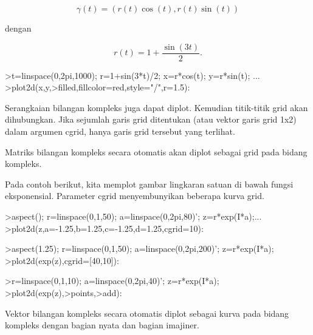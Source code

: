 \documentclass{article}
\begin{document}
\begin{eulernotebook}
\begin{eulercomment}
\begin{eulercomment}
\begin{eulercomment}
\begin{eulercomment}
\begin{eulercomment}
\end{eulercomment}
\begin{eulerformula}
\[
\gamma(t) = (r(t) \cos(t), r(t) \sin(t))
\]
\end{eulerformula}
\begin{eulercomment}
dengan

\end{eulercomment}
\begin{eulerformula}
\[
r(t) = 1 + \dfrac{\sin(3t)}{2}.
\]
\end{eulerformula}
\begin{eulerprompt}
>t=linspace(0,2pi,1000); r=1+sin(3*t)/2; x=r*cos(t); y=r*sin(t); ...
>plot2d(x,y,>filled,fillcolor=red,style="/",r=1.5):
\end{eulerprompt}
\begin{eulercomment}
Serangkaian bilangan kompleks juga dapat diplot. Kemudian titik-titik
grid akan dihubungkan. Jika sejumlah garis grid ditentukan (atau
vektor garis grid 1x2) dalam argumen cgrid, hanya garis grid tersebut
yang terlihat.

Matriks bilangan kompleks secara otomatis akan diplot sebagai grid
pada bidang kompleks.


Pada contoh berikut, kita memplot gambar lingkaran satuan di bawah
fungsi eksponensial. Parameter cgrid menyembunyikan beberapa kurva
grid.
\end{eulercomment}
\begin{eulerprompt}
>aspect(); r=linspace(0,1,50); a=linspace(0,2pi,80)'; z=r*exp(I*a);...
>plot2d(z,a=-1.25,b=1.25,c=-1.25,d=1.25,cgrid=10):
\end{eulerprompt}
\begin{eulerprompt}
>aspect(1.25); r=linspace(0,1,50); a=linspace(0,2pi,200)'; z=r*exp(I*a);
>plot2d(exp(z),cgrid=[40,10]):
\end{eulerprompt}
\begin{eulerprompt}
>r=linspace(0,1,10); a=linspace(0,2pi,40)'; z=r*exp(I*a);
>plot2d(exp(z),>points,>add):
\end{eulerprompt}
\begin{eulercomment}
Vektor bilangan kompleks secara otomatis diplot sebagai kurva pada
bidang kompleks dengan bagian nyata dan bagian imajiner.



\end{eulercomment}
\end{eulercomment}
\end{eulercomment}
\end{eulercomment}
\end{eulercomment}
\end{eulernotebook}
\end{document}
